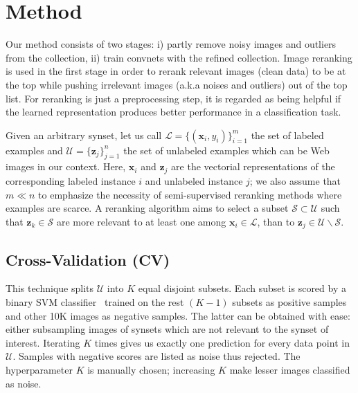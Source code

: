 \documentclass[preprint,12pt]{elsarticle}
\begin{document}
\section{Method}\label{sec:method}
\noindent Our method consists of two stages: i) partly remove noisy images and outliers from the collection, ii) train convnets with the refined collection. Image reranking is used in the first stage in order to rerank relevant images (clean data) to be at the top while pushing irrelevant images (a.k.a noises and outliers) out of the top list. For reranking is just a preprocessing step, it is regarded as being helpful if the learned representation produces better performance in a classification task. %

Given an arbitrary synset, let us call $\mathcal{L}=\{ (\mathbf{x}_i, y_i) \}_{i=1}^{m}$ the set of labeled examples and $\mathcal{U} = \{ \mathbf{z}_j \}_{j=1}^{n}$ the set of unlabeled examples which can be Web images in our context. Here, $\mathbf{x}_i$ and $\mathbf{z}_j$ are the vectorial representations of the corresponding labeled instance $i$ and unlabeled instance $j$; we also assume that $m \ll n$ to emphasize the necessity of semi-supervised reranking methods where examples are scarce. A reranking algorithm aims to select a subset $\mathcal{S} \subset \mathcal{U}$ such that $\mathbf{z}_k \in \mathcal{S}$ are more relevant to at least one among $\mathbf{x}_i \in \mathcal{L}$, than to $\mathbf{z}_j\in\mathcal{U} \backslash \mathcal{S}$.

\subsection{Cross-Validation (CV)} 
\noindent This technique splits $\mathcal{U}$ into $K$ equal disjoint subsets. Each subset is scored by a binary SVM classifier~\cite{cortes1995support} trained on the rest $(K-1)$ subsets as positive samples and other 10K images as negative samples. The latter can be obtained with ease: either subsampling images of synsets which are not relevant to the synset of interest. Iterating $K$ times gives us exactly one prediction for every data point in $\mathcal{U}$. Samples with negative scores are listed as noise thus rejected. The hyperparameter $K$ is manually chosen; increasing $K$ make lesser images classified as noise.
\end{document}
